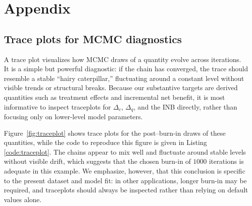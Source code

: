 \documentclass[aoas,preprint]{imsart}
\theoremstyle{plain}
\theoremstyle{definition}
\theoremstyle{remark}
\theoremstyle{remark}
\begin{document}


\clearpage
\setcounter{subsection}{0}
\renewcommand\thesubsection{\Alph{subsection}}
\renewcommand\thefigure{\thesubsection.\arabic{figure}}
\renewcommand\thetable{\thesubsection.\arabic{table}}

\section*{Appendix}\label{sec:appendix}

\subsection{Trace plots for MCMC diagnostics}\label{app:traceplots}

A trace plot visualizes how MCMC draws of a quantity evolve across iterations. It is a simple but powerful diagnostic: if the chain has converged, the trace should resemble a stable “hairy caterpillar,” fluctuating around a constant level without visible trends or structural breaks. Because our substantive targets are derived quantities such as treatment effects and incremental net benefit, it is most informative to inspect traceplots for $\Delta_c$, $\Delta_q$, and the INB directly, rather than focusing only on lower-level model parameters.

Figure~\ref{fig:traceplot} shows trace plots for the post--burn-in draws of these quantities, while the code to reproduce this figure is given in Listing \ref{code:traceplot}. The chains appear to mix well and fluctuate around stable levels without visible drift, which suggests that the chosen burn-in of $1000$ iterations is adequate in this example. We emphasize, however, that this conclusion is specific to the present dataset and model fit: in other applications, longer burn-in may be required, and traceplots should always be inspected rather than relying on default values alone.
\end{document}
